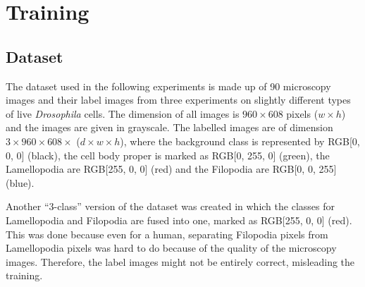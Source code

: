 	\chapter{Training}

	\section{Dataset}
The dataset used in the following experiments is made up of 90 microscopy images and their label images from three experiments on slightly different types of live \textit{Drosophila} cells. The dimension of all images is $960 \times 608$ pixels ($w \times h$) and the images are given in grayscale. The labelled images are of dimension $3 \times 960 \times 608 \times$ ($d \times w \times h$), where the background class is represented by RGB[0, 0, 0] (black), the cell body proper is marked as RGB[0, 255, 0] (green), the Lamellopodia are RGB[255, 0, 0] (red) and the Filopodia are RGB[0, 0, 255] (blue).

Another ``3-class'' version of the dataset was created in which the classes for Lamellopodia and Filopodia are fused into one, marked as RGB[255, 0, 0] (red). This was done because even for a human, separating Filopodia pixels from Lamellopodia pixels was hard to do because of the quality of the microscopy images. Therefore, the label images might not be entirely correct, misleading the training.\\

